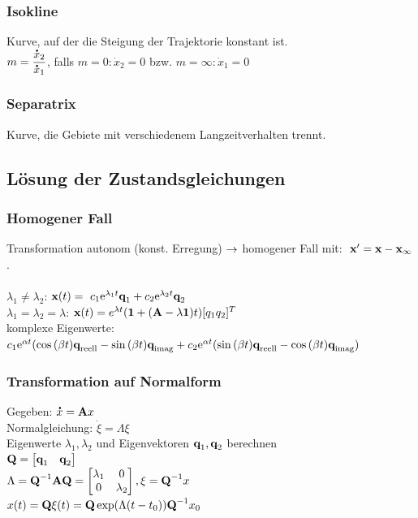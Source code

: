 \documentclass[fs, footer]{latex4ei}
\begin{document}
\begin{multicols*}{4}
    \subsubsection{Isokline}
    Kurve, auf der die Steigung der Trajektorie konstant ist.\\
    $m = \dfrac {\accentset{\mbox{\textrm{\large\bfseries .}} }{x}_2}{\accentset{\mbox{\textrm{\large\bfseries .}} }{x}_1}$, falls $m = 0: \dot x_2 = 0$ bzw. $m = \infty: \dot x_1 = 0$
    \subsubsection{Separatrix}
    Kurve, die Gebiete mit verschiedenem Langzeitverhalten trennt.
    \subsection{Lösung der Zustandsgleichungen}
    \subsubsection{Homogener Fall}
    Transformation autonom (konst. Erregung) $\rightarrow$ homogener Fall mit: $\ \textbf{x}' = \textbf{x} - \textbf{x}_\infty$.\\ \\
    $\lambda_1 \neq \lambda_2$: $\textbf{x}(t) = \ c_1\mathrm{e}^{\lambda_1t}\textbf{q}_1 + c_2\mathrm{e}^{\lambda_2t}\textbf{q}_2$\\
    $\lambda_1 = \lambda_2 = \lambda$: $\textbf{x}(t) = e^{\lambda t}(\textbf{1} + (\textbf{A} -\lambda \textbf{1})t) [q_1 q_2]^T$\\
    komplexe Eigenwerte: $c_1 \mathrm{e}^{\alpha t}(\cos{(\beta t)}\textbf{q}_{\text{reell}} - \sin{(\beta t)}\textbf{q}_{\text{imag}} + c_2\mathrm{e}^{\alpha t}(\sin{(\beta t)}\textbf{q}_{\text{reell}} - \cos{(\beta t)}\textbf{q}_{\text{imag}})$\\
    \subsubsection{Transformation auf Normalform}
    Gegeben: $\accentset{\mbox{\textrm{\large\bfseries .}} }{x} = \textbf{A} x$\\
    Normalgleichung: $\dot{\xi} = \Lambda{}\xi$\\
    Eigenwerte $\lambda_1, \lambda_2$ und Eigenvektoren $\textbf{q}_1, \textbf{q}_2$ berechnen\\
    $\textbf{Q} =  \begin{bmatrix} \textbf{q}_1 & \textbf{q}_2  \end{bmatrix}$\\
    $\Lambda = \textbf{Q}^{-1}\textbf{A}\textbf{Q} = \begin{bmatrix} \lambda_1 & 0 \\ 0 & \lambda_2  \end{bmatrix}, \xi = \textbf{Q}^{-1} x$\\
    $x(t) = \textbf{Q} \xi(t) = \textbf{Q} \exp(\Lambda(t-t_0))\textbf{Q}^{-1} x_0$\\

\end{multicols*}
\end{document}
